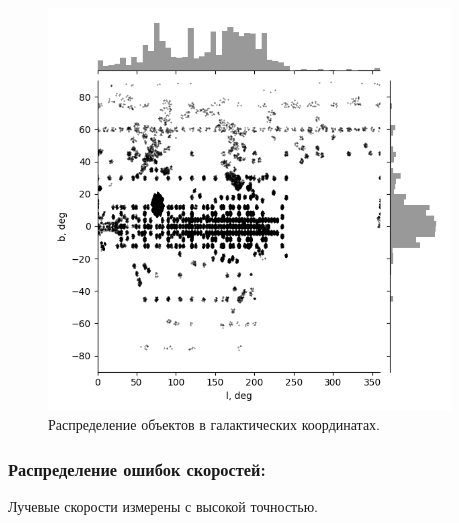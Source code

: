 \documentclass{matmex-diploma-custom}
\begin{document}
\pagebreak

\begin{figure}[h!]
\begin{minipage}[h]{1.0\linewidth}
        \includegraphics[width=0.95\textwidth]{../imgs/lb.png}
\end{minipage}
\caption{Распределение объектов в галактических координатах.}
\end{figure}

\pagebreak
\subsubsection*{Распределение ошибок скоростей:}
Лучевые скорости измерены с высокой точностью.
\end{document}
